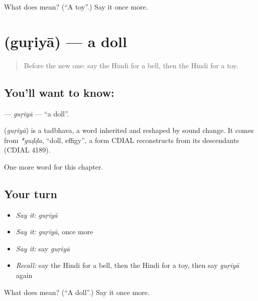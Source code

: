 \begin{tcolorbox}[breakable,colback=teal!4,colframe=teal!35!black,title={Before you move on}]
What does  mean? (\textquotedblleft{}A toy\textquotedblright{}.) Say it once more.
\end{tcolorbox}
\section[\texorpdfstring{\hi{गुड़िया} (guṛiyā)}{गुड़िया (guṛiyā)}]{ (guṛiyā) — a doll}

\label{lesson:HI-C264-guriya}



\begin{quote}
Before the new one: say the Hindi for a bell, then the Hindi for a toy.
\end{quote}

\subsection*{You'll want to know: }
\textbf{} — \emph{guṛiyā} — \textquotedblleft{}a doll\textquotedblright{}.

\begin{cousinweb}
\textbf{} (\emph{guṛiyā}) is a tadbhava, a word inherited and reshaped by sound change. It comes from \emph{*guḍḍa}, \textquotedblleft{}doll, effigy\textquotedblright{}, a form CDIAL reconstructs from its descendants (CDIAL 4189).
\end{cousinweb}

\begin{grammarlens}[title={What you've built}]
One more word for this chapter.
\end{grammarlens}

\subsection*{Your turn}
\begin{itemize}
\raggedright
  \item \emph{Say it:} \emph{guṛiyā}
  \item \emph{Say it:} \emph{guṛiyā}, once more
  \item \emph{Say it:} say \emph{guṛiyā}
  \item \emph{Recall:} say the Hindi for a bell, then the Hindi for a toy, then say \emph{guṛiyā} again
\end{itemize}

\begin{tcolorbox}[breakable,colback=teal!4,colframe=teal!35!black,title={Before you move on}]
What does  mean? (\textquotedblleft{}A doll\textquotedblright{}.) Say it once more.
\end{tcolorbox}
